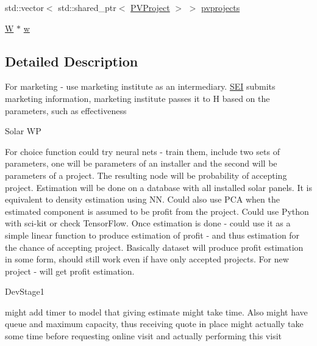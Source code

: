 {\bf }\par
\begin{DoxyCompactItemize}
\item 
std\+::vector$<$ std\+::shared\+\_\+ptr$<$ \hyperlink{classsolar__core_1_1_p_v_project}{P\+V\+Project} $>$ $>$ \hyperlink{classsolar__core_1_1_s_e_i_a76d9d151e51465d534ff0fd3d64f98bc}{pvprojects}
\end{DoxyCompactItemize}

{\bf }\par
\begin{DoxyCompactItemize}
\item 
\hyperlink{classsolar__core_1_1_w}{W} $\ast$ \hyperlink{classsolar__core_1_1_s_e_i_a82e0c6b5f6d83639a08c1bc357fd3466}{w}
\end{DoxyCompactItemize}



\subsection{Detailed Description}
For marketing -\/ use marketing institute as an intermediary. \hyperlink{classsolar__core_1_1_s_e_i}{S\+E\+I} submits marketing information, marketing institute passes it to H based on the parameters, such as effectiveness

\begin{DoxyRefDesc}{Solar W\+P}
\item[\hyperlink{wp__wp000002}{Solar W\+P}]For choice function could try neural nets -\/ train them, include two sets of parameters, one will be parameters of an installer and the second will be parameters of a project. The resulting node will be probability of accepting project. Estimation will be done on a database with all installed solar panels. It is equivalent to density estimation using N\+N. Could also use P\+C\+A when the estimated component is assumed to be profit from the project. Could use Python with sci-\/kit or check Tensor\+Flow. Once estimation is done -\/ could use it as a simple linear function to produce estimation of profit -\/ and thus estimation for the chance of accepting project. Basically dataset will produce profit estimation in some form, should still work even if have only accepted projects. For new project -\/ will get profit estimation. \end{DoxyRefDesc}


\begin{DoxyRefDesc}{Dev\+Stage1}
\item[\hyperlink{_dev_stage1__DevStage1000006}{Dev\+Stage1}]might add timer to model that giving estimate might take time. Also might have queue and maximum capacity, thus receiving quote in place might actually take some time before requesting online visit and actually performing this visit\end{DoxyRefDesc}



